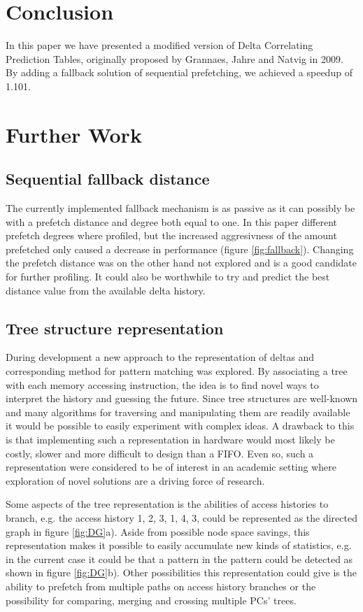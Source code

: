 \documentclass[12pt,journal,compsoc]{IEEEtran}
\begin{document}
\section{Conclusion}
In this paper we have presented a modified version of Delta Correlating
Prediction Tables, originally proposed by Grannaes, Jahre and Natvig in 2009.
\cite{dcptpaper} By adding a fallback solution of sequential prefetching,
we achieved a speedup of 1.101.

\section{Further Work}

\subsection{Sequential fallback distance}
The currently implemented fallback mechanism is as passive
as it can possibly be with a prefetch distance and degree both equal
to one. In this paper different prefetch degrees where profiled, but
the increased aggresivness of the amount prefetched only caused a
decrease in performance (figure \ref{fig:fallback}). Changing the prefetch
distance
was on the other hand not explored and is a good candidate for further
profiling. It could also be worthwhile to try and predict the best distance
value from the available delta history.

\subsection{Tree structure representation}
During development a new approach to the representation of deltas
and corresponding method for pattern matching was explored. By associating
a tree with each memory accessing instruction, the idea is to find novel ways
to interpret the history and guessing the future. Since tree structures
are well-known and many algorithms for traversing and manipulating them
are readily available it would be possible to easily experiment
with complex ideas. A drawback to this is that implementing such a
representation in hardware would most likely be costly, slower
and more difficult to design than a FIFO. Even so, such a
representation were considered to be of interest in an academic
setting where exploration of novel solutions are a driving force of
research.

Some aspects of the tree representation is the abilities of access histories
to branch, e.g. the access history 1, 2, 3, 1, 4, 3, could be represented
as the directed graph in figure \ref{fig:DG}a).
Aside from possible node space savings, this representation makes it
possible to easily accumulate new kinds of statistics, e.g. in the
current case it could be that a pattern in the pattern could be
detected as shown in figure \ref{fig:DG}b). Other possibilities this
representation could give is the ability to prefetch from multiple
paths on access history branches or the possibility for comparing,
merging and crossing multiple PCs' trees.
\end{document}
